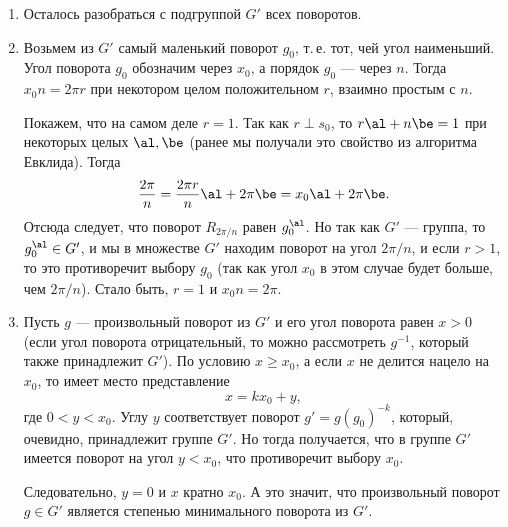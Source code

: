 \begin{enumerate}
\item Осталось разобраться с подгруппой $G'$ всех поворотов.
\item Возьмем из $G'$ самый маленький поворот $g_0$, т.\,е. тот, чей угол наименьший. Угол поворота $g_0$ обозначим через $x_0$, а порядок $g_0$ --- через $n$. Тогда $x_0n=2\pi r$ при некотором целом положительном $r$, взаимно простым с $n$.

Покажем, что на самом деле $r=1$. Так как $r\perp s_0$, то $r\al+n\be=1$ при некоторых целых $\al,\be$ (ранее мы получали это свойство из алгоритма Евклида). Тогда
$$
\frac{2\pi}{n} = \frac{2\pi r}{n}\al + 2\pi\be = x_0\al + 2\pi\be.
$$
Отсюда следует, что поворот $R_{2\pi/n}$ равен $g_0^\al$. Но так как $G'$ --- группа, то $g_0^\al\in G'$, и мы в множестве $G'$ находим поворот на угол $2\pi/n$, и если $r>1$, то это противоречит выбору $g_0$ (так как угол $x_0$ в этом случае будет больше, чем $2\pi/n$). Стало быть, $r=1$ и $x_0n=2\pi$.

\item Пусть $g$ --- произвольный поворот из $G'$ и его угол поворота равен $x>0$ (если угол поворота отрицательный, то можно рассмотреть $g^{-1}$, который также принадлежит $G'$). По условию $x\ge x_0$, а если $x$ не делится нацело на $x_0$, то имеет место представление
$$
x = kx_0+y,
$$
где $0<y<x_0$. Углу $y$ соответствует поворот $g'=g(g_0)^{-k}$, который, очевидно, принадлежит группе $G'$. Но тогда получается, что в группе $G'$ имеется поворот на угол $y<x_0$, что противоречит выбору $x_0$.

Следовательно, $y=0$ и $x$ кратно $x_0$. А это значит, что произвольный поворот $g\in G'$ является степенью минимального поворота из $G'$.


\end{enumerate}
